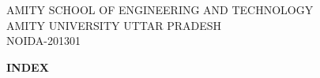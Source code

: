 \documentclass[12pt,a4paper]{article}
\begin{document}
\vfill

\begin{center}
{\fontsize{15.9}{19}\selectfont
AMITY SCHOOL OF ENGINEERING AND TECHNOLOGY\\
AMITY UNIVERSITY UTTAR PRADESH\\
NOIDA-201301}
\end{center}

\vspace{4pt}
\restoregeometry
\newpage

\thispagestyle{empty}
\begin{center}
{\Large\bfseries INDEX}
\end{center}
\end{document}
